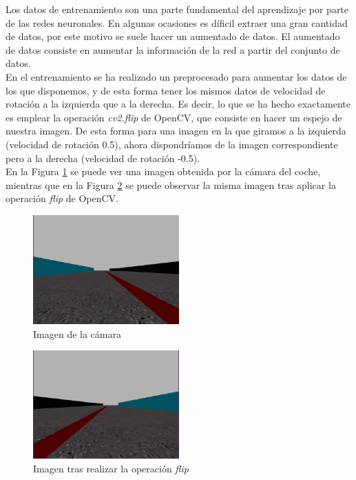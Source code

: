 Los datos de entrenamiento son una parte fundamental del aprendizaje por parte de las redes neuronales. En algunas ocasiones es díficil extraer una gran cantidad de datos, por este motivo se suele hacer un aumentado de datos. El aumentado de datos consiste en aumentar la información de la red a partir del conjunto de datos.\\

En el entrenamiento se ha realizado un preprocesado para aumentar los datos de los que disponemos, y de esta forma tener los mismos datos de velocidad de rotación a la izquierda que a la derecha. Es decir, lo que se ha hecho exactamente es emplear la operación \textit{cv2.flip} de OpenCV, que consiste en hacer un espejo de nuestra imagen. De esta forma para una imagen en la que giramos a la izquierda (velocidad de rotación 0.5), ahora dispondríamos de la imagen correspondiente pero a la derecha (velocidad de rotación -0.5).\\

En la Figura \ref{fig.image_camera} se puede ver una imagen obtenida por la cámara del coche, mientras que en la Figura \ref{fig.image_flip} se puede observar la misma imagen tras aplicar la operación \textit{flip} de OpenCV.\\


\begin{figure}
\begin{center}
	\includegraphics[width=0.5\textwidth]{figures/Regresion/img_normal.png}
   \caption{Imagen de la cámara}
	\label{fig.image_camera}
\end{center}
\end{figure}

\begin{figure}
\begin{center}
	\includegraphics[width=0.5\textwidth]{figures/Regresion/img_flip.png}
   \caption{Imagen tras realizar la operación \textit{flip}}
	\label{fig.image_flip}
\end{center}
\end{figure}


